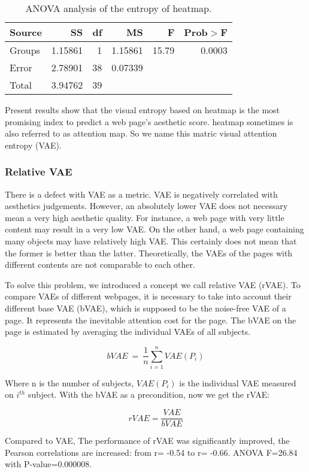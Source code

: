 \begin{table}[H]
\begin{tabular}{lrrrrr}
  Source&SS&df&MS&F&Prob$>$F\\ \hline
  Groups&1.15861&1&1.15861&15.79&0.0003\\
  Error&2.78901&38&0.07339&&\\
  Total&3.94762&39&&&\\
\end{tabular}
\caption{ANOVA analysis of the entropy of heatmap.}
\label{tab:ANOVA-vae-dw}
\end{table}

Present results show that the visual entropy based on heatmap is the most promising index to predict a web page's aesthetic score. heatmap sometimes is also referred to as attention map. So we name this matric visual attention entropy (VAE).

\subsubsection{Relative VAE}
There is a defect with VAE as a metric. VAE is negatively correlated with aesthetics judgements. However, an absolutely lower VAE does not necessary mean a very high aesthetic quality. For instance, a web page with very little content may result in a very low VAE. On the other hand, a web page containing many objects may have relatively high VAE. This certainly does not mean that the former is better than the latter. Theoretically, the VAEs of the pages with different contents are not comparable to each other.

To solve this problem, we introduced a concept we call relative VAE (rVAE). To compare VAEs of different webpages, it is necessary to take into account their different base VAE (bVAE), which is supposed to be the noise-free VAE of a page. It represents the inevitable attention cost for the page. The bVAE on the page is estimated by averaging the individual VAEs of all subjects.

$$bVAE~=~\frac{1}{n}\sum_{i=1}^n VAE(P_i)$$

Where n is the number of subjects, $VAE(P_i)$ is the individual VAE measured on $i^{th}$ subject.
With the bVAE as a precondition, now we get the rVAE:

\begin{equation}
rVAE = \frac{VAE}{bVAE}
\label{formula:rvae}
\end{equation}

Compared to VAE, The performance of rVAE was significantly improved, the Pearson correlations are increased: from r= -0.54 to r= -0.66. ANOVA F=26.84 with P-value=0.000008.

